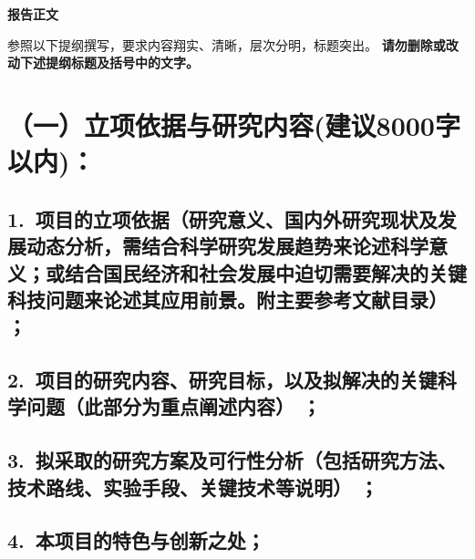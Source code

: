 \documentclass[12pt,UTF8,AutoFakeBold=2.5,a4paper]{ctexart} %
\newcommand{\sanhao}{\fontsize{16pt}{\baselineskip}\selectfont}
\newcommand{\sihao}{\fontsize{14pt}{\baselineskip}\selectfont}
\begin{document}

\begin{center}
{\sanhao \kaishu \bfseries 报告正文}
\end{center}

{\sihao \kaishu 参照以下提纲撰写，要求内容翔实、清晰，层次分明，标题突出。{\color{MsBlue} \bfseries 请勿删除或改动下述提纲标题及括号中的文字。}}
\vskip -5mm

\section{{\bfseries（一）立项依据与研究内容}(建议8000字以内)：} %
\subsection{\hspace{1.45em} 1.~{\bfseries 项目的立项依据}（研究意义、国内外研究现状及发展动态分析，需结合科学研究发展趋势来论述科学意义；或结合国民经济和社会发展中迫切需要解决的关键科技问题来论述其应用前景。附主要参考文献目录）\hspace{-14pt} ；}

{}

{}


\subsection{\hspace{1.45em} 2.~{\bfseries 项目的研究内容、研究目标，以及拟解决的关键科学问题}（此部分为重点阐述内容）\hspace{-14pt} {\bfseries ；}}

{}

\subsection{\hspace{1.45em}  3.~{\bfseries 拟采取的研究方案及可行性分析}（包括研究方法、技术路线、实验手段、关键技术等说明）\hspace{-14pt} ；}

{}

\subsection{\hspace{1.45em}  4.~{\bfseries 本项目的特色与创新之处；}}
\end{document}
